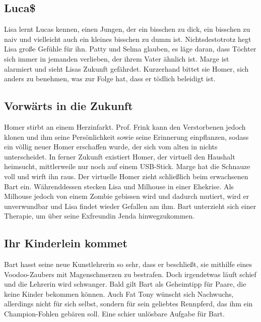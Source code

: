 \subsection{Luca\$}\label{SABF12}
Lisa lernt Lucas kennen, einen Jungen, der ein bisschen zu dick, ein bisschen zu naiv und vielleicht auch ein kleines bisschen zu dumm ist. Nichtsdestotrotz hegt Lisa große Gefühle für ihn. Patty und Selma glauben, es läge daran, dass Töchter sich immer in jemanden verlieben, der ihrem Vater ähnlich ist. Marge ist alarmiert und sieht Lisas Zukunft gefährdet. Kurzerhand bittet sie Homer, sich anders zu benehmen, was zur Folge hat, dass er tödlich beleidigt ist.


\subsection{Vorwärts in die Zukunft}
Homer stirbt an einem Herzinfarkt. Prof. Frink kann den Verstorbenen jedoch klonen und ihm seine Persönlichkeit sowie seine Erinnerung einpflanzen, sodass ein völlig neuer Homer erschaffen wurde, der sich vom alten in nichts unterscheidet. In ferner Zukunft existiert Homer, der virtuell den Haushalt heimsucht, mittlerweile nur noch auf einem USB-Stick. Marge hat die Schnauze voll und wirft ihn raus. Der virtuelle Homer zieht schließlich beim erwachsenen Bart ein. Währenddessen stecken Lisa und Milhouse in einer Ehekrise. Als Milhouse jedoch von einem Zombie gebissen wird und dadurch mutiert, wird er unverwundbar und Lisa findet wieder Gefallen am ihm. Bart unterzieht sich einer Therapie, um über seine Exfreundin Jenda hinwegzukommen.


\subsection{Ihr Kinderlein kommet}\label{SABF14}
Bart hasst seine neue Kunstlehrerin so sehr, dass er beschließt, sie mithilfe eines Voodoo-Zaubers mit Magenschmerzen zu bestrafen. Doch irgendetwas läuft schief und die Lehrerin wird schwanger. Bald gilt Bart als Geheimtipp für Paare, die keine Kinder bekommen können. Auch Fat Tony wünscht sich Nachwuchs, allerdings nicht für sich selbst, sondern für sein geliebtes Rennpferd, das ihm ein Champion-Fohlen gebären soll. Eine schier unlösbare Aufgabe für Bart.


